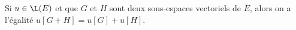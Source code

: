 Si $u\in \L(E)$ et que $G$ et $H$ sont deux sous-espaces vectoriels de $E$, alors on a l'égalité $u[G+H]=u[G]+u[H]$.

\begin{reponses}
\end{reponses}

